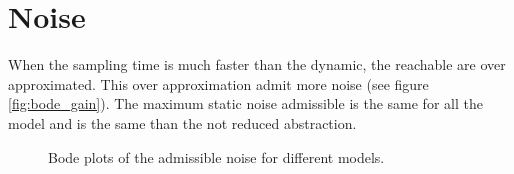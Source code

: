 \section{Noise}
%	
%	
%



When the sampling time is much faster than the dynamic, the reachable are over approximated. This over approximation admit more noise (see figure \ref{fig:bode_gain}).
The maximum static noise admissible is the same for all the model and is the same than the not reduced abstraction.

\begin{figure}

\caption{Bode plots of the admissible noise for different models.}
\end{figure}


